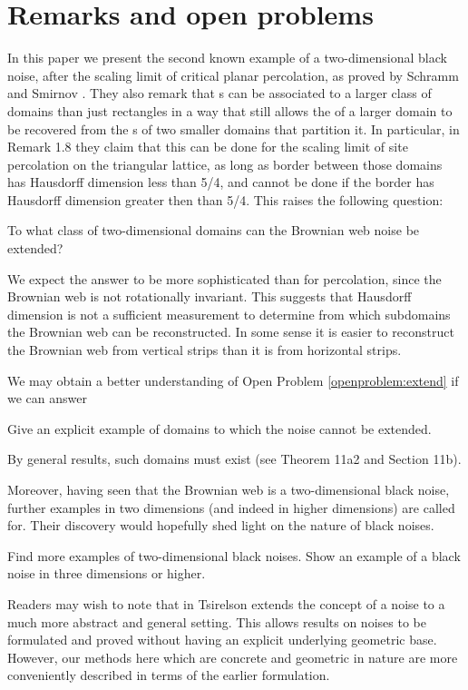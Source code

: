 {
\section{Remarks and open problems}

\label{sec:open-problems}

In this paper we present the second known example of a two-dimensional
black noise, after the scaling limit of critical planar percolation,
as proved by Schramm and Smirnov \cite{schramm-smirnov}.  They also remark
that \sigfield{}s can be associated to a larger class of domains than
just rectangles in a way that still allows the \sigfield{} of a larger
domain to be recovered from the \sigfield{}s of two smaller domains
that partition it.
In particular, in Remark 1.8 they claim that this can be done for the
scaling limit of site percolation on the triangular lattice, as long
as border between those domains has Hausdorff dimension less
than 5/4, and cannot be done if the border has Hausdorff dimension
greater then than 5/4. This raises the following question:

\begin{openproblem}
  \label{openproblem:extend}
  To what class of two-dimensional domains can the Brownian web noise be extended?
\end{openproblem}

We expect the answer to be more sophisticated than for percolation,
since the Brownian web is not rotationally invariant.  
This suggests that Hausdorff dimension is not a sufficient measurement
to determine from which subdomains the Brownian web can be
reconstructed.  In some sense it is easier to reconstruct the Brownian
web from vertical strips than it is from horizontal strips.

We may obtain a better understanding of Open Problem
\ref{openproblem:extend} if we can answer

\begin{openproblem}
  Give an explicit example of domains to which the noise
  cannot be extended.
\end{openproblem}

By general results, such domains must exist (see
\cite{tsirelson-nonclassical-stochastic-flows} Theorem 11a2 and
Section 11b).

Moreover, having seen that the Brownian web is a two-dimensional black
noise, further examples in two dimensions (and indeed in higher
dimensions) are called for.  Their
discovery would hopefully shed light on the nature of black noises.

\begin{openproblem}
  Find more examples of two-dimensional black noises.  Show an example
  of a black noise in three dimensions or higher.
\end{openproblem}

Readers may wish to note that in
\cite{tsirelson-noise-as-a-boolean-algebra} Tsirelson extends the
concept of a noise to a much more abstract and general setting.  This
allows results on noises to be formulated and proved without having an
explicit underlying geometric base.  However, our methods here which are
concrete and geometric in nature are more conveniently described in terms
of the earlier formulation.
}
